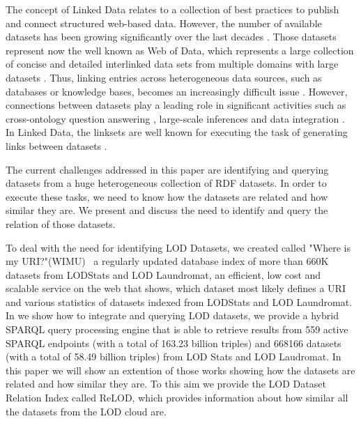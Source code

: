 \documentclass[sw]{iosart2x}
\begin{document}

The concept of Linked Data relates to a collection of best practices to publish and connect structured web-based data.
However, the number of available datasets has been growing significantly over the last decades \cite{bizer2011linked}.
Those datasets represent now the well known as Web of Data, which represents a large collection of concise and detailed interlinked data sets from multiple domains with large datasets \cite{saleem2013linked}.
Thus, linking entries across heterogeneous data sources, such as databases or knowledge bases, becomes an increasingly difficult issue \cite{valdestilhas2017high, NGAU11, saeedi2018scalable}.
However, connections between datasets play a leading role in significant activities such as cross-ontology question answering \cite{lopez2009cross}, large-scale inferences \cite{urbani2010owl} and data integration \cite{rahm2016case}.
In Linked Data, the linksets are well known for executing the task of generating links between datasets \cite{NGAU11}.

The current challenges addressed in this paper are identifying and querying datasets from a huge heterogeneous collection of RDF datasets.
In order to execute these tasks, we need to know how the datasets are related and how similar they are.
We present and discuss the need to identify and query the relation of those datasets.

To deal with the need for identifying LOD Datasets, we created called "Where is my URI?"(WIMU)~\cite{valdestilhas2018my} a regularly updated database index of more than 660K datasets from LODStats and LOD Laundromat, an efficient, low cost and scalable service on the web that shows, which dataset most likely defines a URI and various statistics of datasets indexed from LODStats and LOD Laundromat.
In \cite{valdestilhas2019more} we show how to integrate and querying LOD datasets, we provide a hybrid SPARQL query processing engine that is able to retrieve results from 559 active SPARQL endpoints (with a total of 163.23 billion triples) and \num{668166} datasets (with a total of 58.49 billion triples) from LOD Stats and LOD Laudromat.
In this paper we will show an extention of those works\cite{valdestilhas2018my, valdestilhas2019more} showing how the datasets are related and how similar they are.
To this aim we provide the LOD Dataset Relation Index called ReLOD, which provides information about how similar all the datasets from the LOD cloud are.%
\end{document}

